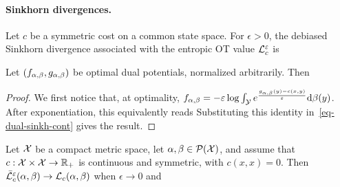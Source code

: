 \paragraph{Sinkhorn divergences.}
\begin{defn}\label{def-sinkhorn-divergence}
Let $c$ be a symmetric cost on a common state space. For $\epsilon>0$, the debiased Sinkhorn divergence associated with the entropic OT value $\mathcal{L}_c^\varepsilon$ is
\end{defn}
\begin{lem}
Let $(f_{\alpha,\beta},g_{\alpha,\beta})$ be optimal dual potentials, normalized arbitrarily. Then
\end{lem}
\begin{proof}
We first notice that, at optimality, $f_{\alpha,\beta} = -\varepsilon\log\int_{\mathcal{Y}} e^{\frac{g_{\alpha,\beta}(y)-c(x,y)}{\varepsilon}} \mathrm{d}\beta(y)$. After exponentiation, this equivalently reads
Substituting this identity in~\eqref{eq-dual-sinkh-cont} gives the result.
\end{proof}
\begin{prop}\label{prop-sinkhorn-divergence-asymptotics}
Let $\mathcal{X}$ be a compact metric space, let $\alpha,\beta\in\mathcal{P}(\mathcal{X})$, and assume that $c:\mathcal{X}\times\mathcal{X}\to\mathbb{R}_+$ is continuous and symmetric, with $c(x,x)=0$.
Then $\bar{\mathcal{L}}_c^\varepsilon(\alpha,\beta) \rightarrow \mathcal{L}_c(\alpha,\beta)$ when $\epsilon\rightarrow 0$ and
\end{prop}
